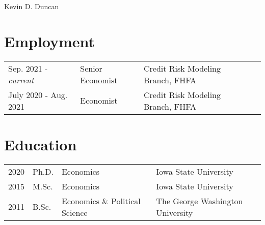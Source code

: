 \documentclass[letterpaper]{article}
\def\name{Kevin D. Duncan}
\begin{document}
{\huge \name} 


\vspace{0.25in}




\section*{Employment}

\begin{tabular}{@{}llll}
  Sep. 2021 - \textit{current}  & Senior Economist & Credit Risk Modeling Branch, FHFA \\
  July 2020 - Aug. 2021  & Economist & Credit Risk Modeling Branch, FHFA \\
 
\end{tabular}

\section*{Education}

\begin{tabular}{@{}llll}
  2020  & Ph.D. & Economics &Iowa State University \\
    2015 &M.Sc. & Economics &Iowa State University \\
  2011 & B.Sc. & Economics \& Political Science & The George Washington University
\end{tabular}
\end{document}
